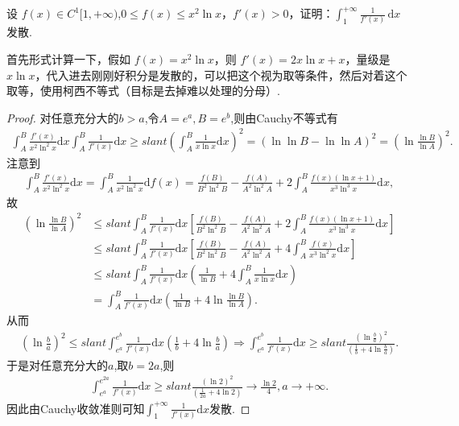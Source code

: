 \documentclass[../../main.tex]{subfiles}
\begin{document}
\begin{example}
设 $f(x)\in C^{1}[1,+\infty)$,$0\leqslant  f(x)\leqslant  x^{2}\ln x$，$f'(x)>0$，证明：$\int_{1}^{+\infty}\frac{1}{f'(x)}\,\mathrm{d}x$ 发散.
\end{example}
\begin{note}
首先形式计算一下，假如 $f(x)=x^{2}\ln x$，则 $f'(x)=2x\ln x+x$，量级是 $x\ln x$，代入进去刚刚好积分是发散的，可以把这个视为取等条件，然后对着这个取等，使用柯西不等式（目标是去掉难以处理的分母）.
\end{note}
\begin{proof}
对任意充分大的$b>a$,令$A=e^a,B=e^b$,则由Cauchy不等式有
\begin{align*}
\int_A^B{\frac{f' \left( x \right)}{x^2\ln ^2x}\mathrm{d}x}\int_A^B{\frac{1}{f' \left( x \right)}\mathrm{d}x}\geqslant slant \left( \int_A^B{\frac{1}{x\ln x}\mathrm{d}x} \right) ^2=\left( \ln\ln B-\ln\ln A \right) ^2=\left( \ln \frac{\ln B}{\ln A} \right) ^2.
\end{align*}
注意到
\begin{align*}
\int_A^B{\frac{f' \left( x \right)}{x^2\ln ^2x}\mathrm{d}x}=\int_A^B{\frac{1}{x^2\ln ^2x}\mathrm{d}f\left( x \right)}=\frac{f\left( B \right)}{B^2\ln ^2B}-\frac{f\left( A \right)}{A^2\ln ^2A}+2\int_A^B{\frac{f\left( x \right) \left( \ln x+1 \right)}{x^3\ln ^3x}\mathrm{d}x},
\end{align*}
故
\begin{align*}
\left( \ln \frac{\ln B}{\ln A} \right) ^2&\leqslant slant \int_A^B{\frac{1}{f' \left( x \right)}\mathrm{d}x}\left[ \frac{f\left( B \right)}{B^2\ln ^2B}-\frac{f\left( A \right)}{A^2\ln ^2A}+2\int_A^B{\frac{f\left( x \right) \left( \ln x+1 \right)}{x^3\ln ^3x}\mathrm{d}x} \right] \\
&\leqslant slant \int_A^B{\frac{1}{f' \left( x \right)}\mathrm{d}x}\left[ \frac{f\left( B \right)}{B^2\ln ^2B}-\frac{f\left( A \right)}{A^2\ln ^2A}+4\int_A^B{\frac{f\left( x \right)}{x^3\ln ^2x}\mathrm{d}x} \right] \\
&\leqslant slant \int_A^B{\frac{1}{f' \left( x \right)}\mathrm{d}x}\left( \frac{1}{\ln B}+4\int_A^B{\frac{1}{x\ln x}\mathrm{d}x} \right) \\
&=\int_A^B{\frac{1}{f' \left( x \right)}\mathrm{d}x}\left( \frac{1}{\ln B}+4\ln \frac{\ln B}{\ln A} \right) .
\end{align*}
从而
\begin{align*}
\left( \ln \frac{b}{a} \right) ^2\leqslant slant \int_{e^a}^{e^b}{\frac{1}{f' \left( x \right)}\mathrm{d}x}\left( \frac{1}{b}+4\ln \frac{b}{a} \right)
\Rightarrow \int_{e^a}^{e^b}{\frac{1}{f' \left( x \right)}\mathrm{d}x}\geqslant slant \frac{\left( \ln \frac{b}{a} \right) ^2}{\left( \frac{1}{b}+4\ln \frac{b}{a} \right)}.
\end{align*}
于是对任意充分大的$a$,取$b=2a$,则
\begin{align*}
\int_{e^a}^{e^{2a}}{\frac{1}{f' \left( x \right)}\mathrm{d}x}\geqslant slant \frac{\left( \ln 2 \right) ^2}{\left( \frac{1}{2a}+4\ln 2 \right)}\rightarrow \frac{\ln 2}{4},a\rightarrow +\infty .
\end{align*}
因此由Cauchy收敛准则可知$\int_1^{+\infty}{\frac{1}{f' \left( x \right)}\mathrm{d}x}$发散.
\end{proof}
\end{document}
